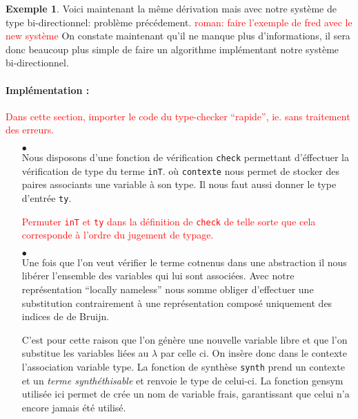\documentclass {article}
\newcommand{\codefrom}[3]
           {}
\theoremstyle{definition}
\newtheorem{example}{Exemple}
\theoremstyle{remark}
\newcommand{\todo}[1]{\textcolor{red}{#1}}
\newcommand{\fun}[1]{\lstinline!#1!}
\begin{document}
\begin{example}
  Voici maintenant la même dérivation mais avec notre système de type bi-directionnel:
  problème précédement.
  \todo{roman: faire l'exemple de fred avec le new système}
  On constate maintenant qu'il ne manque plus d'informations, il sera donc beaucoup plus simple
  de faire un algorithme implémentant notre système bi-directionnel.
\end{example}

\paragraph{Implémentation :}

\todo{Dans cette section, importer le code du type-checker ``rapide'', ie. sans traitement des erreurs.}

\begin{itemize}
  
\item[$\bullet$] \\
  
  Nous disposons d'une fonction de vérification \lstinline!check!
  permettant d'éffectuer la vérification de type du terme \fun{inT}.
  où \fun{contexte} nous permet de stocker
  des paires associants une variable à son type. Il nous faut aussi
  donner le type d'entrée \fun{ty}.
    
  \todo{Permuter \lstinline!inT! et \lstinline!ty! dans la définition de
    \lstinline!check! de telle sorte que cela corresponde à l'ordre du
    jugement de typage.}
  \codefrom{typed}{lambda}{check_def} 
  
\item[$\bullet$]  \\
  
  Une fois que l'on veut vérifier le terme cotnenus dans une abstraction il nous libérer l'ensemble des variables
  qui lui sont associées. Avec notre représentation ``locally nameless'' nous somme obliger d'effectuer une substitution
  contrairement à une représentation composé uniquement des indices de de Bruijn.
  
  C'est pour cette raison que l'on génère une nouvelle variable libre et que l'on substitue les variables liées 
  au $\lambda$ par celle ci. On insère donc dans le contexte l'association variable type.
  La fonction de synthèse \lstinline!synth! prend un contexte et un
  \emph{terme synthéthisable} et renvoie le type de celui-ci.
  La fonction gensym utilisée ici permet de crée un nom de variable frais, garantissant que celui n'a encore jamais
été utilisé. 
%
 \codefrom{typed}{lambda}{check_abs}


\end{itemize}
\end{document}
